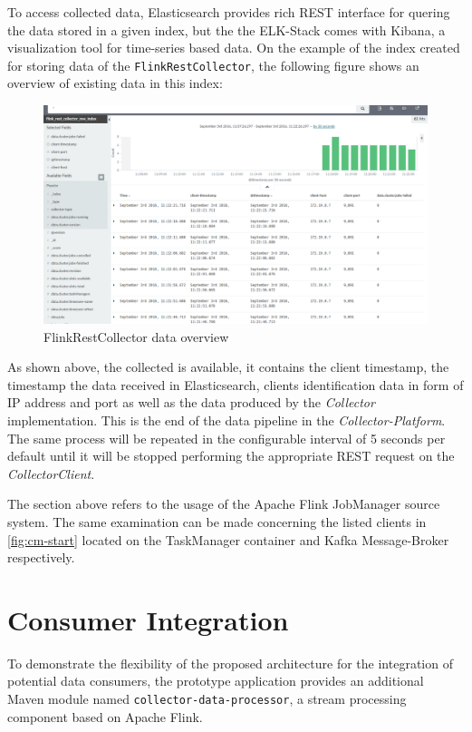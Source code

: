 To access collected data, Elasticsearch provides rich REST interface for quering the data stored in a given index, but the the ELK-Stack
comes with Kibana, a visualization tool for time-series based data. On the example of the index created for storing data of the
\verb|FlinkRestCollector|, the following figure shows an overview of existing data in this index:
\begin{figure}[H]
	\centering
	\includegraphics[width=1.0\textwidth]{../images/13-kibana.png}
	\caption{FlinkRestCollector data overview}
	\label{fig:kibana}
\end{figure}

As shown above, the collected is available, it contains the client timestamp, the timestamp the data received in Elasticsearch, clients
identification data in form of IP address and port as well as the data produced by the \textit{Collector} implementation.
This is the end of the data pipeline in the \textit{Collector-Platform}. The same process will be repeated in the configurable interval
of 5 seconds per default until it will be stopped performing the appropriate REST request on the \textit{CollectorClient}.

The section above refers to the usage of the Apache Flink JobManager source system. The same examination can be made concerning
the listed clients in \autoref{fig:cm-start} located on the TaskManager container and Kafka Message-Broker respectively.

\section{Consumer Integration}

To demonstrate the flexibility of the proposed architecture for the integration of potential data consumers, the prototype application
provides an additional Maven module named \verb|collector-data-processor|, a stream processing component based on Apache Flink.

